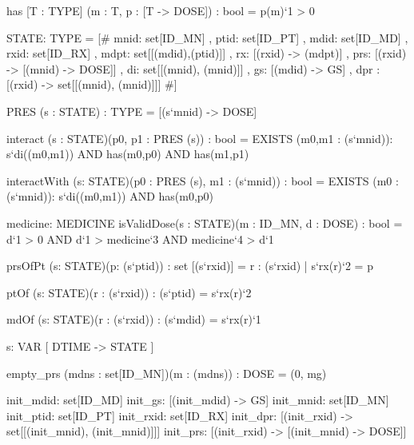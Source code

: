 \begin{pvs}
  has [T : TYPE] (m : T, p : [T -> DOSE]) : bool = p(m)`1 > 0

  STATE: TYPE =
    [#
        mnid: set[ID_MN]  %
      ,	ptid: set[ID_PT]  %
      , mdid: set[ID_MD]  %
      ,	rxid: set[ID_RX]  %
      , mdpt: set[[(mdid),(ptid)]] %
      , rx:   [(rxid) -> (mdpt)]   %
      , prs: [(rxid) -> [(mnid) -> DOSE]] %
      , di: set[[(mnid), (mnid)]]  %
      , gs: [(mdid) -> GS] %
      , dpr : [(rxid) -> set[[(mnid), (mnid)]]]
   #]

  PRES (s : STATE) : TYPE =  [(s`mnid) -> DOSE]

  interact (s : STATE)(p0, p1 : PRES (s)) : bool =
  	   EXISTS (m0,m1 : (s`mnid)):
	   	  s`di((m0,m1))
	      AND has(m0,p0)
	      AND has(m1,p1)

  interactWith (s: STATE)(p0 : PRES (s), m1 : (s`mnid)) : bool =
  	   EXISTS (m0 : (s`mnid)): s`di((m0,m1)) AND has(m0,p0)

	   medicine: MEDICINE
  isValidDose(s : STATE)(m : ID_MN, d : DOSE) : 
  bool = d`1 > 0 AND d`1 > medicine`3 AND medicine`4 > d`1

  prsOfPt (s: STATE)(p: (s`ptid)) : set [(s`rxid)] =
  	  { r : (s`rxid) | s`rx(r)`2 = p }

  ptOf (s: STATE)(r : (s`rxid)) : (s`ptid) = s`rx(r)`2

  mdOf (s: STATE)(r : (s`rxid)) : (s`mdid) = s`rx(r)`1

  s: VAR [ DTIME -> STATE ]

  empty_prs (mdns : set[ID_MN])(m : (mdns)) : DOSE = (0, mg)

  init_mdid: set[ID_MD]
  init_gs: [(init_mdid) -> GS]
  init_mnid: set[ID_MN]
  init_ptid: set[ID_PT]
  init_rxid: set[ID_RX]
  init_dpr: [(init_rxid) -> set[[(init_mnid), (init_mnid)]]]
  init_prs: [(init_rxid) -> [(init_mnid) -> DOSE]] 
 

\end{pvs}
